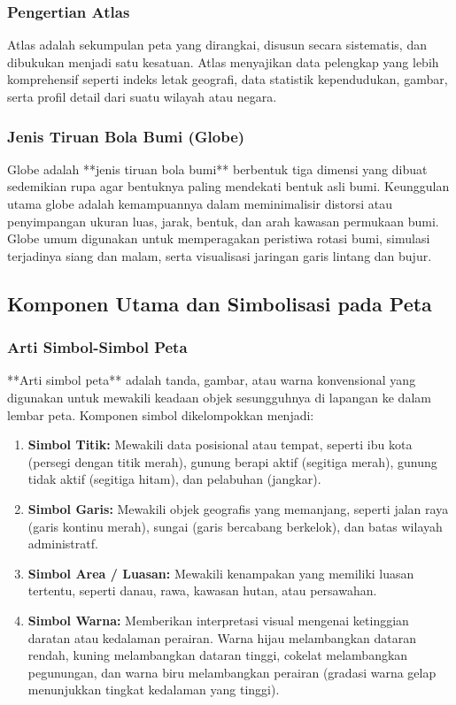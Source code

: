 \documentclass[12pt, a4paper]{article}
\begin{document}
\subsubsection{Pengertian Atlas}
Atlas adalah sekumpulan peta yang dirangkai, disusun secara sistematis, dan dibukukan menjadi satu kesatuan. Atlas menyajikan data pelengkap yang lebih komprehensif seperti indeks letak geografi, data statistik kependudukan, gambar, serta profil detail dari suatu wilayah atau negara.

\subsubsection{Jenis Tiruan Bola Bumi (Globe)}
Globe adalah **jenis tiruan bola bumi** berbentuk tiga dimensi yang dibuat sedemikian rupa agar bentuknya paling mendekati bentuk asli bumi. Keunggulan utama globe adalah kemampuannya dalam meminimalisir distorsi atau penyimpangan ukuran luas, jarak, bentuk, dan arah kawasan permukaan bumi. Globe umum digunakan untuk memperagakan peristiwa rotasi bumi, simulasi terjadinya siang dan malam, serta visualisasi jaringan garis lintang dan bujur.

\subsection{Komponen Utama dan Simbolisasi pada Peta}

\subsubsection{Arti Simbol-Simbol Peta}
**Arti simbol peta** adalah tanda, gambar, atau warna konvensional yang digunakan untuk mewakili keadaan objek sesungguhnya di lapangan ke dalam lembar peta. Komponen simbol dikelompokkan menjadi:
\begin{enumerate}
    \item \textbf{Simbol Titik:} Mewakili data posisional atau tempat, seperti ibu kota (persegi dengan titik merah), gunung berapi aktif (segitiga merah), gunung tidak aktif (segitiga hitam), dan pelabuhan (jangkar).
    \item \textbf{Simbol Garis:} Mewakili objek geografis yang memanjang, seperti jalan raya (garis kontinu merah), sungai (garis bercabang berkelok), dan batas wilayah administratf.
    \item \textbf{Simbol Area / Luasan:} Mewakili kenampakan yang memiliki luasan tertentu, seperti danau, rawa, kawasan hutan, atau persawahan.
    \item \textbf{Simbol Warna:} Memberikan interpretasi visual mengenai ketinggian daratan atau kedalaman perairan. Warna hijau melambangkan dataran rendah, kuning melambangkan dataran tinggi, cokelat melambangkan pegunungan, dan warna biru melambangkan perairan (gradasi warna gelap menunjukkan tingkat kedalaman yang tinggi).
\end{enumerate}
\end{document}
